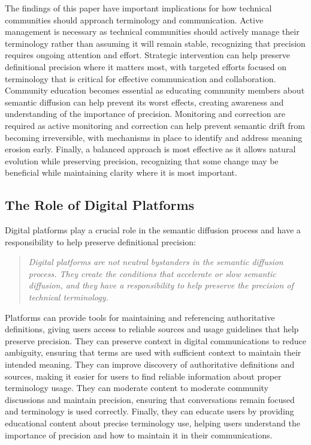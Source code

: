 \documentclass[11pt]{article}
\begin{document}
The findings of this paper have important implications for how technical communities should approach terminology and communication. Active management is necessary as technical communities should actively manage their terminology rather than assuming it will remain stable, recognizing that precision requires ongoing attention and effort. Strategic intervention can help preserve definitional precision where it matters most, with targeted efforts focused on terminology that is critical for effective communication and collaboration. Community education becomes essential as educating community members about semantic diffusion can help prevent its worst effects, creating awareness and understanding of the importance of precision. Monitoring and correction are required as active monitoring and correction can help prevent semantic drift from becoming irreversible, with mechanisms in place to identify and address meaning erosion early. Finally, a balanced approach is most effective as it allows natural evolution while preserving precision, recognizing that some change may be beneficial while maintaining clarity where it is most important.

\subsection{The Role of Digital Platforms}

Digital platforms play a crucial role in the semantic diffusion process and have a responsibility to help preserve definitional precision:

\begin{quote}
\emph{Digital platforms are not neutral bystanders in the semantic diffusion process. They create the conditions that accelerate or slow semantic diffusion, and they have a responsibility to help preserve the precision of technical terminology.}
\end{quote}

Platforms can provide tools for maintaining and referencing authoritative definitions, giving users access to reliable sources and usage guidelines that help preserve precision. They can preserve context in digital communications to reduce ambiguity, ensuring that terms are used with sufficient context to maintain their intended meaning. They can improve discovery of authoritative definitions and sources, making it easier for users to find reliable information about proper terminology usage. They can moderate content to moderate community discussions and maintain precision, ensuring that conversations remain focused and terminology is used correctly. Finally, they can educate users by providing educational content about precise terminology use, helping users understand the importance of precision and how to maintain it in their communications.
\end{document}
